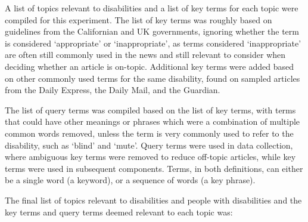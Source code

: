 \documentclass{report}
\begin{document}
A list of topics relevant to disabilities and a list of key terms for each topic were compiled for this experiment.
The list of key terms was roughly based on guidelines from the Californian \cite{ca-guideline} and UK \cite{uk-guideline} governments, ignoring whether the term is considered `appropriate' or `inappropriate', as terms considered `inappropriate' are often still commonly used in the news and still relevant to consider when deciding whether an article is on-topic. 
Additional key terms were added based on other commonly used terms for the same disability, found on sampled articles from the Daily Express, the Daily Mail, and the Guardian.

The list of query terms was compiled based on the list of key terms, with terms that could have other meanings or phrases which were a combination of multiple common words removed, unless the term is very commonly used to refer to the disability, such as `blind' and `mute'.
Query terms were used in data collection, where ambiguous key terms were removed to reduce off-topic articles, while key terms were used in subsequent components.
Terms, in both definitions, can either be a single word (a keyword), or a sequence of words (a key phrase).

The final list of topics relevant to disabilities and people with disabilities and the key terms and query terms deemed relevant to each topic was: 
\end{document}
